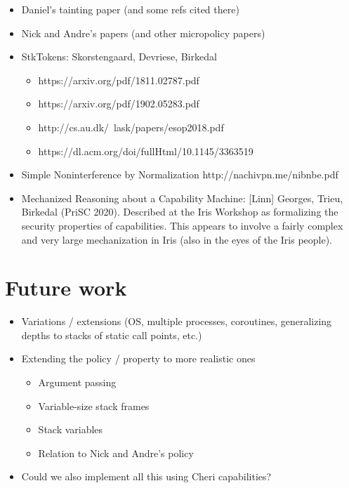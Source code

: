 \documentclass[conference]{IEEEtran}
\newif\iftext \textfalse
\begin{document}
\begin{itemize}
\item Daniel's tainting paper (and some refs cited there)
\item Nick and Andre's papers (and other micropolicy papers)
\item StkTokens: Skorstengaard, Devriese, Birkedal
\begin{itemize}
\item {https://arxiv.org/pdf/1811.02787.pdf}
\item {https://arxiv.org/pdf/1902.05283.pdf}
\item {http://cs.au.dk/~lask/papers/esop2018.pdf}
\item {https://dl.acm.org/doi/fullHtml/10.1145/3363519}
\end{itemize}

\item Simple Noninterference by Normalization {http://nachivpn.me/nibnbe.pdf}

\item Mechanized Reasoning about a Capability Machine: [Linn] Georges,
Trieu, Birkedal (PriSC 2020).
%
Described at the Iris Workshop as formalizing the security properties of
capabilities. This appears to involve a fairly complex and very large
mechanization in Iris (also in the eyes of the Iris people).
\end{itemize}

\iftext
\section{Future work}

\begin{itemize}
\item Variations / extensions (OS, multiple processes, coroutines, generalizing depths to stacks of static call points, etc.)
\item Extending the policy / property to more realistic ones
\begin{itemize}
\item Argument passing
\item Variable-size stack frames
\item Stack variables
\item Relation to Nick and Andre’s policy
\end{itemize}
\item Could we also implement all this using Cheri capabilities?
\end{itemize}
\end{document}
